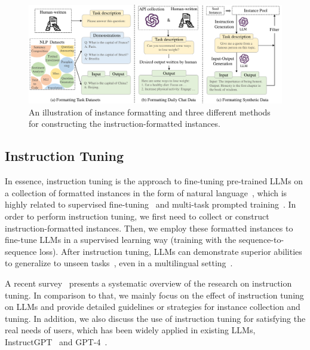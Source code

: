 \begin{figure}[h]
    \centering
    \includegraphics[width=1\textwidth]{images/Instruction-Tuning-new.pdf}
    \caption{An illustration of instance formatting and three different methods for constructing the instruction-formatted instances. }
    \label{fig:instruction-tuning}
\end{figure}



\subsection{Instruction Tuning}
\label{sec-instruction}
In essence, instruction tuning is the approach to fine-tuning  pre-trained  LLMs on a collection of formatted instances in the form of natural language~\cite{Wei-ICLR-2022-Finetuned}, which is highly related to supervised fine-tuning~\cite{Ouyang-arxiv-2022-Training} and multi-task prompted training~\cite{Sanh-ICLR-2022-Multitask}. %
In order to perform instruction tuning, we first need to collect or construct instruction-formatted instances. 
Then, we employ these formatted instances to fine-tune LLMs in a supervised learning way (\eg training with the sequence-to-sequence loss). 
After instruction tuning, LLMs can demonstrate superior abilities to generalize to unseen tasks~\cite{Wei-ICLR-2022-Finetuned,Sanh-ICLR-2022-Multitask,Chung-arxiv-2022-Scaling}, even in a multilingual setting~\cite{Muennighoff-2022-arxiv-Crosslingual}. 


A recent survey~\cite{Lou-arXiv-2023-Is} presents a systematic overview of the research on instruction tuning. In comparison to that, we mainly focus on the effect of instruction tuning on LLMs and provide detailed guidelines or strategies for instance collection and tuning. In addition, we also discuss the use of instruction tuning for satisfying the real needs of users, which has been widely applied in existing LLMs, \eg InstructGPT~\cite{Ouyang-arxiv-2022-Training} and GPT-4~\cite{OpenAI-OpenAI-2023-GPT-4}.



